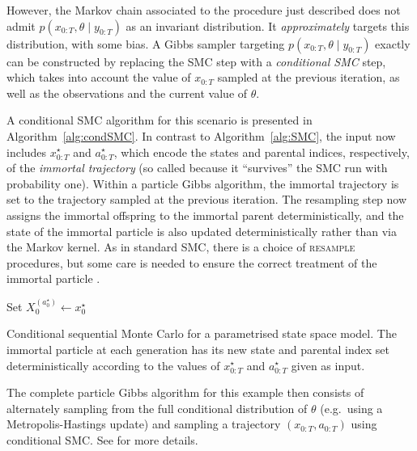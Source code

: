 However, the Markov chain associated to the procedure just described does not admit $p(x_{0:T},\theta \mid y_{0:T})$ as an invariant distribution. It \emph{approximately} targets this distribution, with some bias.
A Gibbs sampler targeting $p(x_{0:T},\theta \mid y_{0:T})$ exactly can be constructed by replacing the SMC step with a \emph{conditional SMC} step, which takes into account the value of $x_{0:T}$ sampled at the previous iteration, as well as the observations and the current value of $\theta$.

A conditional SMC algorithm for this scenario is presented in Algorithm~\ref{alg:condSMC}.
In contrast to Algorithm~\ref{alg:SMC}, the input now includes $x_{0:T}^\star$ and $a_{0:T}^\star$, which encode the states and parental indices, respectively, of the \emph{immortal trajectory} (so called because it ``survives'' the SMC run with probability one). Within a particle Gibbs algorithm, the immortal trajectory is set to the trajectory sampled at the previous iteration.
The resampling step now assigns the immortal offspring to the immortal parent deterministically, and the state of the immortal particle is also updated deterministically rather than via the Markov kernel.
As in standard SMC, there is a choice of \textsc{resample} procedures, but some care is needed to ensure the correct treatment of the immortal particle \parencite{lee2019}.

\begin{algorithm}[ht]
\vspace*{10pt}
\DontPrintSemicolon
{}
Set $X_0^{(a_0^\star)} \gets x_0^\star$\;
\vspace*{10pt}
\caption[Conditional sequential Monte Carlo for a parametrised state space model]{Conditional sequential Monte Carlo for a parametrised state space model. The immortal particle at each generation has its new state and parental index set deterministically according to the values of $x_{0:T}^\star$ and $a_{0:T}^\star$ given as input.}
\label{alg:condSMC}
\end{algorithm}
The complete particle Gibbs algorithm for this example then consists of alternately sampling from the full conditional distribution of $\theta$ (e.g.\ using a Metropolis-Hastings update) and sampling a trajectory $(x_{0:T}, a_{0:T})$ using conditional SMC. See \textcite[Section 2.4.3]{andrieu2010} for more details.




